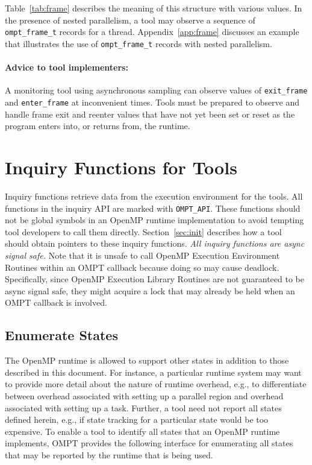 \documentclass{article}
\begin{document}
\noindent
Table~\ref{tab:frame} describes the meaning of this structure with various values.
In the presence of nested parallelism, a tool may observe a sequence of \verb|ompt_frame_t| records for a thread. Appendix~\ref{app:frame} discusses  an example that illustrates the use of \verb|ompt_frame_t| records with nested parallelism.

\paragraph{Advice to tool implementers:} A monitoring tool using
      asynchronous sampling can observe values of 
      \verb|exit_frame| and \verb|enter_frame| at inconvenient times. 
      Tools must be prepared to observe and handle frame exit and reenter values that have not yet been set or reset as the program enters into, or returns from, the runtime. 

\section{Inquiry Functions for Tools}
\label{sec:inquiry}

 Inquiry functions retrieve data from the execution environment for
 the tools. 
 All functions in the inquiry API are marked with \verb|OMPT_API|. These functions should not be global symbols in an OpenMP runtime implementation to avoid tempting tool developers to call them directly. Section~\ref{sec:init} describes how a tool should obtain pointers to these inquiry functions.
 {\em All inquiry functions are async signal safe.} 
 Note that it is unsafe to call OpenMP Execution Environment Routines within an OMPT callback because doing so may cause deadlock. 
 Specifically, since OpenMP Execution Library Routines are not guaranteed to be async signal safe, they might acquire a lock that may already be held when an OMPT callback is involved.
 
 \subsection{Enumerate States}
 \label{ompt_enumerate_states}
 
 The OpenMP runtime is allowed to support other states in addition to those described in this document.
For instance, a particular runtime system may want to 
provide more detail about the nature of runtime overhead, 
e.g., to differentiate between  overhead associated with setting up a parallel region
and  overhead associated with setting up a task. Further, a tool need not report all states defined herein, e.g., if state tracking for a particular state would be too expensive.
To enable a tool to identify all states that an OpenMP runtime implements, OMPT provides
the following interface for enumerating all states that may be reported by the runtime that is being used.
\end{document}
